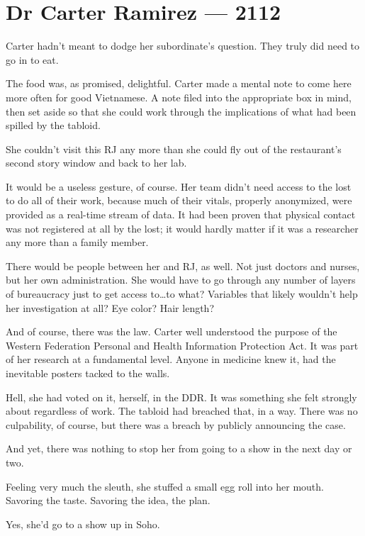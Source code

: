 \hypertarget{dr-carter-ramirez-2112}{%
\chapter*{Dr Carter Ramirez — 2112}\label{dr-carter-ramirez-2112}}

Carter hadn't meant to dodge her subordinate's question. They truly did need to go in to eat.

The food was, as promised, delightful. Carter made a mental note to come here more often for good Vietnamese. A note filed into the appropriate box in mind, then set aside so that she could work through the implications of what had been spilled by the tabloid.

She couldn't visit this RJ any more than she could fly out of the restaurant's second story window and back to her lab.

It would be a useless gesture, of course. Her team didn't need access to the lost to do all of their work, because much of their vitals, properly anonymized, were provided as a real-time stream of data. It had been proven that physical contact was not registered at all by the lost; it would hardly matter if it was a researcher any more than a family member.

There would be people between her and RJ, as well. Not just doctors and nurses, but her own administration. She would have to go through any number of layers of bureaucracy just to get access to\ldots{}to what? Variables that likely wouldn't help her investigation at all? Eye color? Hair length?

And of course, there was the law. Carter well understood the purpose of the Western Federation Personal and Health Information Protection Act. It was part of her research at a fundamental level. Anyone in medicine knew it, had the inevitable posters tacked to the walls.

Hell, she had voted on it, herself, in the DDR. It was something she felt strongly about regardless of work. The tabloid had breached that, in a way. There was no culpability, of course, but there was a breach by publicly announcing the case.

And yet, there was nothing to stop her from going to a show in the next day or two.

Feeling very much the sleuth, she stuffed a small egg roll into her mouth. Savoring the taste. Savoring the idea, the plan.

Yes, she'd go to a show up in Soho.

